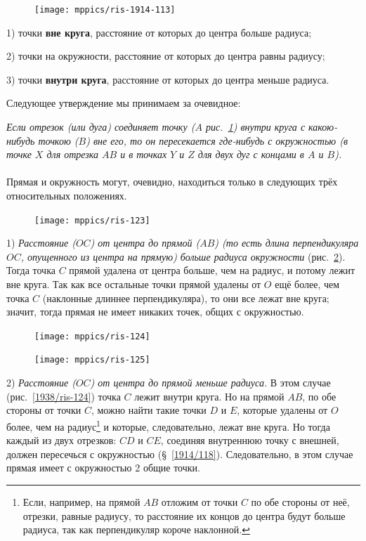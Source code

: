 \documentclass[twoside]{book}
\makeatletter
\newcommand{\rindex}[2][\imki@jobname]{%
  \index[#1]{\detokenize{#2}}%
}
\makeatother
\begin{document}
\begin{figure}
\centering
\texttt{[image: mppics/ris-1914-113]}
\caption{}\label{1914/ris-113}
\end{figure}


1) точки \rindex{внешние точки круга}\textbf{вне круга}, расстояние от которых до центра больше радиуса; 

2) точки на окружности, расстояние от которых до центра равны радиусу; 

3) точки \rindex{внутренние точки круга}\textbf{внутри круга}, расстояние от которых до центра меньше радиуса. 

Следующее утверждение мы принимаем за очевидное:

\emph{Если отрезок (или дуга) соединяет точку \emph{($A$ рис.~\ref{1914/ris-113})} внутри круга с какою-нибудь точкою \emph{($B$)} вне его, то он пересекается где-нибудь с окружностью \emph{(в точке $X$ для отрезка $AB$ и в точках $Y$ и $Z$ для двух дуг с концами в $A$ и $B$)}.}



\paragraph{}\label{1938/112}
Прямая и окружность могут, очевидно, находиться только в следующих трёх относительных положениях.

\begin{figure}
\centering
\texttt{[image: mppics/ris-123]}
\caption{}\label{1938/ris-123}
\end{figure}

1) \emph{Расстояние \emph{($OC$)} от центра до прямой \emph{($AB$) (то есть длина перпендикуляра $OC$, опущенного из центра на прямую)} больше радиуса окружности} (рис.~\ref{1938/ris-123}).
Тогда точка $C$ прямой удалена от центра больше, чем на радиус, и потому лежит вне круга.
Так как все остальные точки прямой удалены от $O$ ещё более, чем точка $C$ (наклонные длиннее перпендикуляра), то они все лежат вне круга;
значит, тогда прямая не имеет никаких точек, общих с окружностью.

\begin{figure}
\centering
\texttt{[image: mppics/ris-124]}
\caption{}\label{1938/ris-124}
\bigskip
\texttt{[image: mppics/ris-125]}
\caption{}\label{1938/ris-125}
\end{figure}

2) \emph{Расстояние \emph{($OC$)} от центра до прямой меньше радиуса.}
В этом случае (рис.~\ref{1938/ris-124}) точка $C$ лежит внутри круга. 
Но на прямой $AB$, по обе стороны от точки $C$, можно найти такие точки $D$ и $E$, которые удалены от $O$ более, чем на радиус\footnote{Если, например, на прямой $AB$ отложим от точки $C$ по обе стороны от неё, отрезки, равные радиусу, то расстояние их концов до центра будут больше радиуса, так как перпендикуляр короче наклонной.}
и которые, следовательно, лежат вне круга.
Но тогда каждый из двух отрезков: $CD$ и $CE$, соединяя внутреннюю точку с внешней, должен пересечься с окружностью (§~\ref{1914/118}).
Следовательно, в этом случае прямая имеет с окружностью 2 общие точки.
\end{document}
